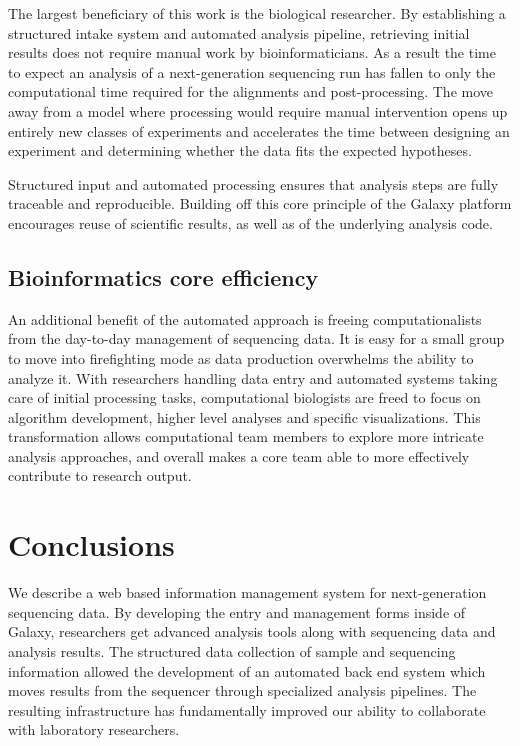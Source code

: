 \documentclass[10pt]{bmc_article}
\newenvironment{bmcformat}{\begin{raggedright}\baselineskip20pt\sloppy\setboolean{publ}{false}}{\end{raggedright}\baselineskip20pt\sloppy}
\begin{document}
\begin{bmcformat}
The largest beneficiary of this work is the biological
researcher. By establishing a structured intake
system and automated analysis pipeline, retrieving initial results
does not require manual work by bioinformaticians. As a result
the time to expect an analysis of a next-generation sequencing run has
fallen to only the computational time required for the alignments and
post-processing. The move away from a model where processing would
require manual intervention opens up entirely new classes of
experiments and accelerates the time between designing an experiment
and determining whether the data fits the expected hypotheses.

Structured input and automated processing ensures that analysis steps
are fully traceable and reproducible. Building off this core principle
of the Galaxy platform encourages reuse of scientific results, as well
as of the underlying analysis code.

\subsection*{Bioinformatics core efficiency}

An additional benefit of the automated approach is freeing
computationalists from the day-to-day management of
sequencing data. It is easy for a small group to move into
firefighting mode as data production overwhelms the ability to
analyze it. With researchers handling data entry and automated systems
taking care of initial processing tasks, computational biologists are
freed to focus on algorithm development, higher level analyses and
specific visualizations. This transformation allows computational team
members to explore more intricate analysis approaches, and overall
makes a core team able to more effectively contribute to research
output.

\section*{Conclusions}

We describe a web based information management system for
next-generation sequencing data. By developing the entry and
management forms inside of Galaxy, researchers get advanced analysis
tools along with sequencing data and analysis results. The structured
data collection of sample and sequencing information allowed the
development of an automated back end system which moves results from
the sequencer through specialized analysis pipelines. The resulting
infrastructure has fundamentally improved our ability to collaborate
with laboratory researchers.


\end{bmcformat}
\end{document}
